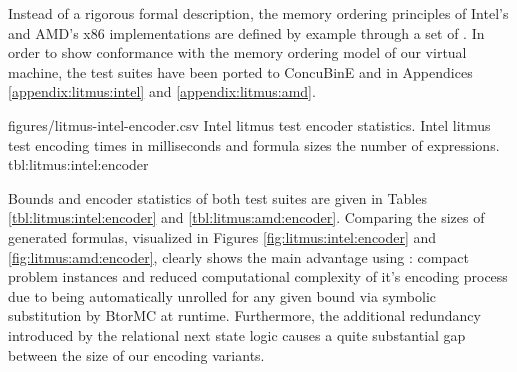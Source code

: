 Instead of a rigorous formal description, the memory ordering principles of Intel's \cite{ref:Intel} and AMD's \cite{ref:AMD} x86 implementations are defined by example through a set of .
In order to show conformance with the memory ordering model of our virtual machine, the test suites have been ported to ConcuBinE and  in Appendices \ref{appendix:litmus:intel} and \ref{appendix:litmus:amd}.



\newcommand{\IntelRowHeader}[1]{\hyperref[tbl:litmus:intel:#1]{#1}}
\newcommand{\AMDRowHeader}[1]{\hyperref[tbl:litmus:amd:#1]{#1}}

\EncoderStatsTable
  {figures/litmus-intel-encoder.csv}
  {\textnumero}
  {\IntelRowHeader}
  {Intel litmus test encoder statistics.}
  {Intel litmus test encoding times in milliseconds and formula sizes  the number of expressions.}
  {tbl:litmus:intel:encoder}


Bounds and encoder statistics of both test suites are given in Tables \ref{tbl:litmus:intel:encoder} and \ref{tbl:litmus:amd:encoder}.
Comparing the sizes of generated formulas, visualized in Figures \ref{fig:litmus:intel:encoder} and \ref{fig:litmus:amd:encoder}, clearly shows the main advantage  using {\BTOR}:
compact problem instances and reduced computational complexity of it's encoding process
due to being automatically unrolled for any given bound via symbolic substitution by BtorMC at runtime.
Furthermore, the additional redundancy introduced by the relational next state logic causes a quite substantial gap between the size of our {\SMTLIB} encoding variants.

